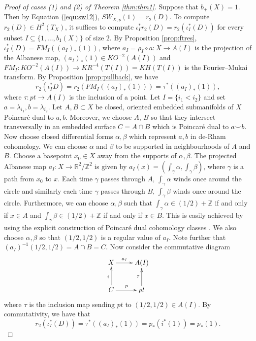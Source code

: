 \documentclass{amsart}
\theoremstyle{definition}
\theoremstyle{remark}
\numberwithin{equation}{section}
\begin{document}
\begin{proof}[Proof of cases (1) and (2) of Theorem \ref{thm:thm1}] Suppose that $b_+(X) = 1$. Then by Equation (\ref{equ:sw12}), $SW_{X,\mathfrak{s}}(1) = r_2(D)$. To compute $r_2(D) \in H^2(T_X)$, it suffices to compute $\iota_I^* r_2(D) = r_2( \iota_I^*(D) )$ for every subset $I \subseteq \{1,\dots , b_1(X)\}$ of size $2$. By Proposition \ref{prop:ftres}, $\iota_I^*(D) = FM_I( (a_I)_*(1) )$, where $a_I = \rho_I \circ a : X \to A(I)$ is the projection of the Albanese map, $(a_I)_*(1) \in KO^{-2}( A(I) )$ and $FM_I : KO^{-2}( A(I) ) \to KR^{-4}( T(I) ) = KH( T(I) )$ is the Fourier--Mukai transform. By Proposition \ref{prop:pullback}, we have
\[
r_2( \iota_I^* D ) = r_2( FM_I( (a_I)_*(1) ) ) = \tau^*( (a_I)_*(1) ),
\]
where $\tau : pt \to A(I)$ is the inclusion of a point. Let $I = \{ i_1 < i_2 \}$ and set $a = \lambda_{i_1}, b = \lambda_{i_2}$. Let $A, B \subset X$ be closed, oriented embedded submanifolds of $X$ Poincar\'e dual to $a,b$. Moreover, we choose $A$, $B$ so that they intersect transversally in an embedded surface $C = A \cap B$ which is Poincar\'e dual to $a \smallsmile b$. Now choose closed differential forms $\alpha, \beta$ which represent $a,b$ in de-Rham cohomology. We can choose $\alpha$ and $\beta$ to be supported in neighbourhoods of $A$ and $B$. Choose a basepoint $x_0 \in X$ away from the supports of $\alpha, \beta$. The projected Albanese map $a_I : X \to \mathbb{R}^2/\mathbb{Z}^2$ is given by $a_I(x) = ( \int_{\gamma} \alpha , \int_{\gamma} \beta )$, where $\gamma$ is a path from $x_0$ to $x$. Each time $\gamma$ passes through $A$, $\int_{\gamma} \alpha$ winds once around the circle and similarly each time $\gamma$ passes through $B$, $\int_{\gamma} \beta$ winds once around the circle. Furthermore, we can choose $\alpha, \beta$ such that $\int_{\gamma} \alpha \in (1/2) + \mathbb{Z}$ if and only if $x \in A$ and $\int_{\gamma} \beta \in (1/2) + \mathbb{Z}$ if and only if $x \in B$. This is easily achieved by using the explicit construction of Poincar\'e dual cohomology classes \cite[Chapter I, ]{botu}. We also choose $\alpha, \beta$ so that $(1/2 , 1/2)$ is a regular value of $a_I$. Note further that $(a_I)^{-1}( 1/2 , 1/2 ) = A \cap B = C$. Now consider the commutative diagram
\[
\xymatrix{
X \ar[r]^-{a_I} & A(I) \\
C \ar[u]^{i} \ar[r]^{p} & pt \ar[u]^{\tau}
}
\]
where $\tau$ is the inclusion map sending $pt$ to $(1/2 , 1/2 ) \in A(I)$. By commutativity, we have that
\[
r_2( \iota_I^*(D) ) = \tau^*( (a_I)_*(1) ) = p_*( i^*(1) ) = p_*(1).
\]
\end{proof}
\end{document}
